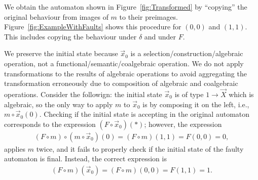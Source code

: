 We obtain the automaton shown in Figure~\ref{fig:Transformed} by ``copying'' the original behaviour from images of $m$ to their preimages. Figure~\ref{fig:ExampleWithFaults} shows this procedure for $(0,0)$ and $(1,1)$. This includes copying the behaviour under $\delta$ and under $F$. 

We preserve the initial state because $\vec{x}_0$ is a selection/construction/algebraic operation, not a functional/semantic/coalgebraic operation. We do not apply transformations to the results of algebraic operations to avoid aggregating the transformation erroneously due to composition of algebraic and coalgebraic operations. Consider the followign: the initial state $\vec{x}_0$ is of type $1\rightarrow\vec{X}$ which is algebraic, so the only way to apply $m$ to $\vec{x}_0$ is by composing it on the left, i.e., $m\circ \vec{x}_0(0)$. Checking if the initial state is accepting in the original automaton corresponds to the expression $(F\circ\vec{x}_0)(*)$; however, the expression
\begin{align*}
    (F\circ m)\circ (m\circ\vec{x}_0)(0)= (F\circ m)(1,1)=F(0,0)=0,
\end{align*}
applies $m$ twice, and it fails to properly check if the initial state of the faulty automaton is final. Instead, the correct expression is 
\begin{align*}
    (F\circ m)(\vec{x}_0)= (F\circ m)(0,0)=F(1,1)=1.
\end{align*}

